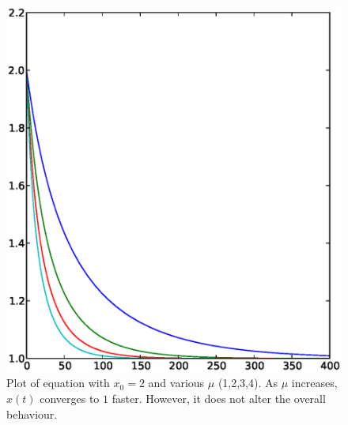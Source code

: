 \documentclass[11pt]{book}
\begin{document}
\begin{figure}[h]
  \begin{center}
    \includegraphics[scale=0.5]{logistic_diffeq_mu1234_x2}
  \end{center}
  \caption{
    Plot of equation  with $x_0 = 2$ and various $\mu$ (1,2,3,4).
    As $\mu$ increases, $x(t)$ converges to $1$ faster.
    However, it does not alter the overall behaviour.
  }
  \label{fig:logistic_diffeq2}
\end{figure}
\end{document}
